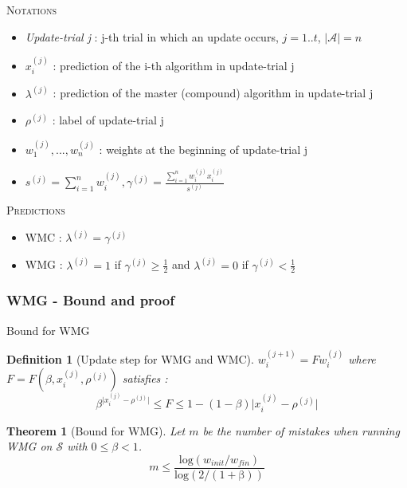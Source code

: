 \documentclass{beamer}
\newtheorem{Th}{Theorem}
\newtheorem{Def}{Definition}
\begin{document}
\begin{frame}

\textsc{Notations}
\begin{itemize}
\item \textit{Update-trial j} : j-th trial  in which an update occurs, $j = 1..t$, $\lvert\mathcal{A}\rvert = n$
\item $x_i^{(j)}$ : prediction of the i-th algorithm in update-trial j
\item $\lambda^{(j)}$ : prediction of the master (compound) algorithm in update-trial j
\item $\rho^{(j)}$ : label of update-trial j
\item $w_1^{(j)}, ..., w_n^{(j)}$ : weights at the beginning of update-trial j
\item $s^{(j)} = \sum_{i=1}^{n}w_i^{(j)}, \gamma^{(j)} = \frac{\sum_{i=1}^{n}w_i^{(j)}x_i^{(j)}}{s^{(j)}}$\newline
\end{itemize}
\textsc{Predictions}
\begin{itemize}
\item WMC : $\lambda^{(j)} = \gamma^{(j)}$
\item WMG : $\lambda^{(j)} = 1$ if $\gamma^{(j)} \geq \frac{1}{2}$ and $\lambda^{(j)} = 0$ if $\gamma^{(j)} < \frac{1}{2}$
\end{itemize}

\end{frame}		

			\subsubsection*{WMG - Bound and proof}

\begin{frame}{Bound for WMG}

\begin{Def}[Update step for WMG and WMC]
$w_i^{(j+1)} = F w_i^{(j)}$ where $F = F(\beta,x_i^{(j)},\rho^{(j)})$ satisfies : 
\[\beta^{\lvert x_i^{(j)} - \rho^{(j)} \rvert} \leq F \leq 1-(1-\beta)\lvert x_i^{(j)} - \rho^{(j)} \rvert\] 
\end{Def}

\begin{Th}[Bound for WMG]
Let $m$ be the number of mistakes when running WMG on $\mathcal{S}$ with $0 \leq \beta <1$.
\[m \leq \frac{\mathrm{log}(w_{init}/w_{fin})}{\mathrm{log(2/(1+\beta))}}\]
\end{Th}

\end{frame}
		
\end{document}
